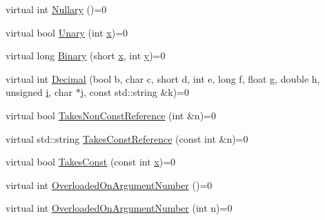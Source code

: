 \begin{DoxyCompactItemize}
\item 
virtual int \mbox{\hyperlink{classtesting_1_1gmock__generated__function__mockers__test_1_1_foo_interface_a633e753eafa7f82dde22ecf9492f341c}{Nullary}} ()=0
\item 
virtual bool \mbox{\hyperlink{classtesting_1_1gmock__generated__function__mockers__test_1_1_foo_interface_ae0885ac29bc4a3f180f6573d8b1a341e}{Unary}} (int \mbox{\hyperlink{_obj__test_2lib_2googletest-master_2googlemock_2test_2gmock-matchers__test_8cc_a6150e0515f7202e2fb518f7206ed97dc}{x}})=0
\item 
virtual long \mbox{\hyperlink{classtesting_1_1gmock__generated__function__mockers__test_1_1_foo_interface_a59ea28b711ece054ce9d57c2dc574ba0}{Binary}} (short \mbox{\hyperlink{_obj__test_2lib_2googletest-master_2googlemock_2test_2gmock-matchers__test_8cc_a6150e0515f7202e2fb518f7206ed97dc}{x}}, int \mbox{\hyperlink{_obj__test_2lib_2googletest-master_2googlemock_2test_2gmock-matchers__test_8cc_a39cb44155237f0205e0feb931d5acbed}{y}})=0
\item 
virtual int \mbox{\hyperlink{classtesting_1_1gmock__generated__function__mockers__test_1_1_foo_interface_a5a389017205848c7b7055c071cca0c6d}{Decimal}} (bool b, char c, short d, int e, long f, float g, double h, unsigned \mbox{\hyperlink{_obj__test_2lib_2googletest-master_2googlemock_2test_2gmock-matchers__test_8cc_acb559820d9ca11295b4500f179ef6392}{i}}, char $\ast$j, const std\+::string \&k)=0
\item 
virtual bool \mbox{\hyperlink{classtesting_1_1gmock__generated__function__mockers__test_1_1_foo_interface_a694354adfffcee58093298bc12182ff5}{Takes\+Non\+Const\+Reference}} (int \&n)=0
\item 
virtual std\+::string \mbox{\hyperlink{classtesting_1_1gmock__generated__function__mockers__test_1_1_foo_interface_aae85be7a3d1b53625fbeeac4694292d3}{Takes\+Const\+Reference}} (const int \&n)=0
\item 
virtual bool \mbox{\hyperlink{classtesting_1_1gmock__generated__function__mockers__test_1_1_foo_interface_a8c53e87edf0b9da878e5259f02b7f5dc}{Takes\+Const}} (const int \mbox{\hyperlink{_obj__test_2lib_2googletest-master_2googlemock_2test_2gmock-matchers__test_8cc_a6150e0515f7202e2fb518f7206ed97dc}{x}})=0
\item 
virtual int \mbox{\hyperlink{classtesting_1_1gmock__generated__function__mockers__test_1_1_foo_interface_ae9e86ac64fa9acedfb1fa747174c7f43}{Overloaded\+On\+Argument\+Number}} ()=0
\item 
virtual int \mbox{\hyperlink{classtesting_1_1gmock__generated__function__mockers__test_1_1_foo_interface_a1b5ff8cc745af475e0abba5d2858e1c9}{Overloaded\+On\+Argument\+Number}} (int n)=0

\end{DoxyCompactItemize}
